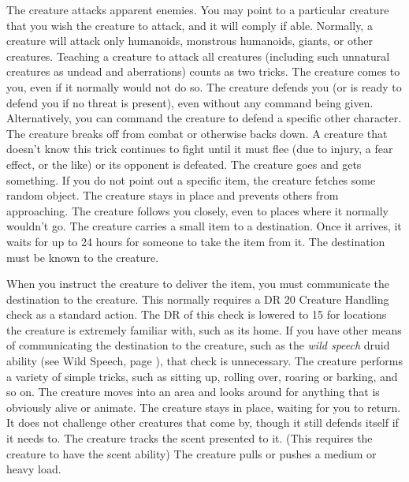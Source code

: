          The creature attacks apparent enemies. You may point to a particular creature that you wish the creature to attack, and it will comply if able. Normally, a creature will attack only humanoids, monstrous humanoids, giants, or other creatures. Teaching a creature to attack all creatures (including such unnatural creatures as undead and aberrations) counts as two tricks.
         The creature comes to you, even if it normally would not do so.
         The creature defends you (or is ready to defend you if no threat is present), even without any command being given. Alternatively, you can command the creature to defend a specific other character.
         The creature breaks off from combat or otherwise backs down. A creature that doesn't know this trick continues to fight until it must flee (due to injury, a fear effect, or the like) or its opponent is defeated.
         The creature goes and gets something. If you do not point out a specific item, the creature fetches some random object.
         The creature stays in place and prevents others from approaching.
         The creature follows you closely, even to places where it normally wouldn't go.
         The creature carries a small item to a destination.
        Once it arrives, it waits for up to 24 hours for someone to take the item from it.
        The destination must be known to the creature.
        \par When you instruct the creature to deliver the item, you must communicate the destination to the creature.
        This normally requires a DR 20 Creature Handling check as a standard action.
        The DR of this check is lowered to 15 for locations the creature is extremely familiar with, such as its home.
        If you have other means of communicating the destination to the creature, such as the \textit{wild speech} druid ability (see Wild Speech, page ), that check is unnecessary.
         The creature performs a variety of simple tricks, such as sitting up, rolling over, roaring or barking, and so on.
         The creature moves into an area and looks around for anything that is obviously alive or animate.
         The creature stays in place, waiting for you to return. It does not challenge other creatures that come by, though it still defends itself if it needs to.
         The creature tracks the scent presented to it. (This requires the creature to have the scent ability)
         The creature pulls or pushes a medium or heavy load.

